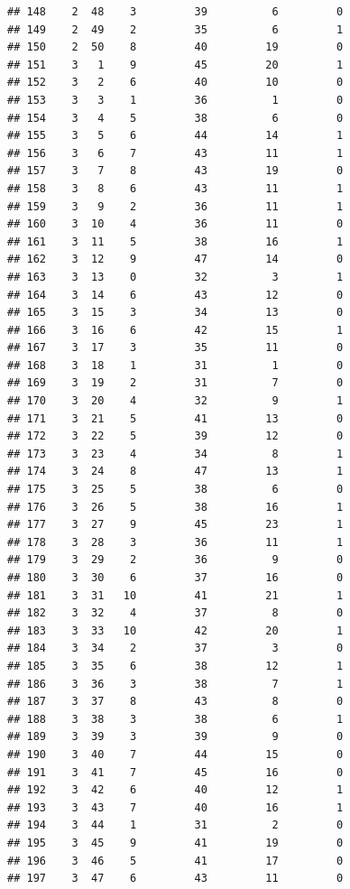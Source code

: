 \documentclass[]{book}
\begin{document}
\begin{verbatim}
## 148    2  48    3         39          6         0
## 149    2  49    2         35          6         1
## 150    2  50    8         40         19         0
## 151    3   1    9         45         20         1
## 152    3   2    6         40         10         0
## 153    3   3    1         36          1         0
## 154    3   4    5         38          6         0
## 155    3   5    6         44         14         1
## 156    3   6    7         43         11         1
## 157    3   7    8         43         19         0
## 158    3   8    6         43         11         1
## 159    3   9    2         36         11         1
## 160    3  10    4         36         11         0
## 161    3  11    5         38         16         1
## 162    3  12    9         47         14         0
## 163    3  13    0         32          3         1
## 164    3  14    6         43         12         0
## 165    3  15    3         34         13         0
## 166    3  16    6         42         15         1
## 167    3  17    3         35         11         0
## 168    3  18    1         31          1         0
## 169    3  19    2         31          7         0
## 170    3  20    4         32          9         1
## 171    3  21    5         41         13         0
## 172    3  22    5         39         12         0
## 173    3  23    4         34          8         1
## 174    3  24    8         47         13         1
## 175    3  25    5         38          6         0
## 176    3  26    5         38         16         1
## 177    3  27    9         45         23         1
## 178    3  28    3         36         11         1
## 179    3  29    2         36          9         0
## 180    3  30    6         37         16         0
## 181    3  31   10         41         21         1
## 182    3  32    4         37          8         0
## 183    3  33   10         42         20         1
## 184    3  34    2         37          3         0
## 185    3  35    6         38         12         1
## 186    3  36    3         38          7         1
## 187    3  37    8         43          8         0
## 188    3  38    3         38          6         1
## 189    3  39    3         39          9         0
## 190    3  40    7         44         15         0
## 191    3  41    7         45         16         0
## 192    3  42    6         40         12         1
## 193    3  43    7         40         16         1
## 194    3  44    1         31          2         0
## 195    3  45    9         41         19         0
## 196    3  46    5         41         17         0
## 197    3  47    6         43         11         0

\end{verbatim}
\end{document}
